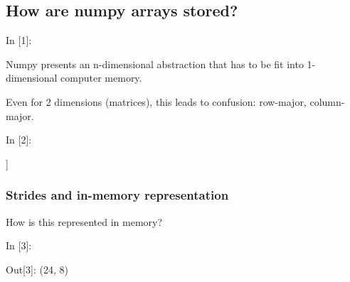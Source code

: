 
    \hypertarget{how-are-numpy-arrays-stored}{%
\subsection{How are numpy arrays
stored?}\label{how-are-numpy-arrays-stored}}

    \begin{BGVerbatim}[commandchars=\\\{\}]
{\color{incolor}In [{\color{incolor}1}]:}    
\end{BGVerbatim}

    Numpy presents an n-dimensional abstraction that has to be fit into
1-dimensional computer memory.

Even for 2 dimensions (matrices), this leads to confusion: row-major,
column-major.

    \begin{BGVerbatim}[commandchars=\\\{\}]
{\color{incolor}In [{\color{incolor}2}]:}    
\end{BGVerbatim}

    \begin{BGVerbatim}[commandchars=\\\{\}]
[[0 1 2]
 [3 4 5]
 [6 7 8]]

    \end{BGVerbatim}

    \hypertarget{strides-and-in-memory-representation}{%
\subsubsection{Strides and in-memory
representation}\label{strides-and-in-memory-representation}}

    How is this represented in memory?

    \begin{BGVerbatim}[commandchars=\\\{\}]
{\color{incolor}In [{\color{incolor}3}]:} 
\end{BGVerbatim}

\begin{BGVerbatim}[commandchars=\\\{\}]
{\color{outcolor}Out[{\color{outcolor}3}]:} (24, 8)
\end{BGVerbatim}
            
